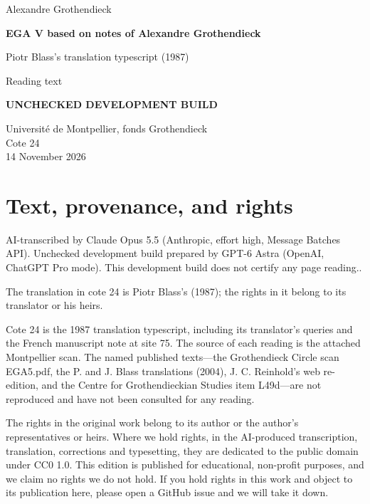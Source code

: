 \documentclass[10pt,a4paper]{article}
\newcommand{\EditionForm}{Reading text}
\begin{document}
\hypersetup{pageanchor=false}\begin{titlepage}\thispagestyle{empty}\vspace*{20mm}
{\Large Alexandre Grothendieck\par}\vspace{12mm}
{\Huge\bfseries EGA V based on notes of Alexandre Grothendieck\par}\vspace{8mm}
{\Large Piotr Blass's translation typescript (1987)\par}\vspace{7mm}
{\large\EditionForm\par}\vspace{12mm}
{\large\bfseries\color{deletedred}UNCHECKED DEVELOPMENT BUILD\par}\vspace{10mm}
Université de Montpellier, fonds Grothendieck\\ Cote 24\\
14 November 2026
\vfill\end{titlepage}\clearpage\hypersetup{pageanchor=true}
\section*{Text, provenance, and rights}
AI-transcribed by Claude Opus 5.5 (Anthropic, effort high, Message Batches API). Unchecked development build prepared by GPT-6 Astra (OpenAI, ChatGPT Pro mode). This development build does not certify any page reading..

The translation in cote 24 is Piotr Blass's (1987); the rights in it belong to its translator or his heirs.

Cote 24 is the 1987 translation typescript, including its translator's queries and the French manuscript note at site 75. The source of each reading is the attached Montpellier scan. The named published texts---the Grothendieck Circle scan EGA5.pdf, the P. and J. Blass translations (2004), J. C. Reinhold's web re-edition, and the Centre for Grothendieckian Studies item L49d---are not reproduced and have not been consulted for any reading.

The rights in the original work belong to its author or the author's representatives or heirs. Where we hold rights, in the AI-produced transcription, translation, corrections and typesetting, they are dedicated to the public domain under CC0 1.0. This edition is published for educational, non-profit purposes, and we claim no rights we do not hold. If you hold rights in this work and object to its publication here, please open a GitHub issue and we will take it down.
\end{document}
